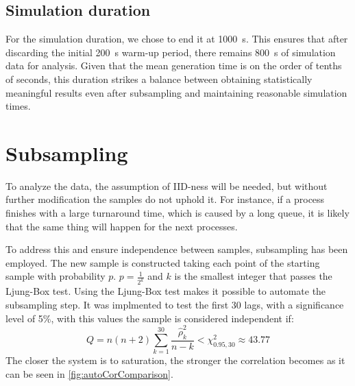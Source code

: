 \subsection{Simulation duration}

For the simulation duration, we chose to end it at \SI{1000}{\second}. This ensures that after discarding the initial \SI{200}{\second} warm-up period, there remains \SI{800}{\second} of simulation data for analysis. Given that the mean generation time is on the order of tenths of seconds, this duration strikes a balance between obtaining statistically meaningful results even after subsampling and maintaining reasonable simulation times.


\section{Subsampling}

To analyze the data, the assumption of IID-ness will be needed, but without further modification the samples do not uphold it.
For instance, if a process finishes with a large turnaround time, which is caused by a long queue, it is likely that the same thing will happen for the next processes.

To address this and ensure independence between samples, subsampling has been employed. The new sample is constructed taking each point of the starting sample with probability $p$.
$p = \frac{1}{2^k}$ and $k$ is the smallest integer that passes the Ljung-Box test.
Using the Ljung-Box test makes it possible to automate the subsampling step. It was implmented to test the first 30 lags, with a significance level of 5\%, with this values the sample is considered independent if:
\vspace{-0.5\baselineskip}
\begin{equation}
    Q = n(n+2) \sum_{k=1}^{30} \frac{\hat{\rho}_k^2}{n-k} < \chi^2_{0.95,30} \approx 43.77
\end{equation}
The closer the system is to saturation, the stronger the correlation becomes as it can be seen in \cref{fig:autoCorComparison}.

